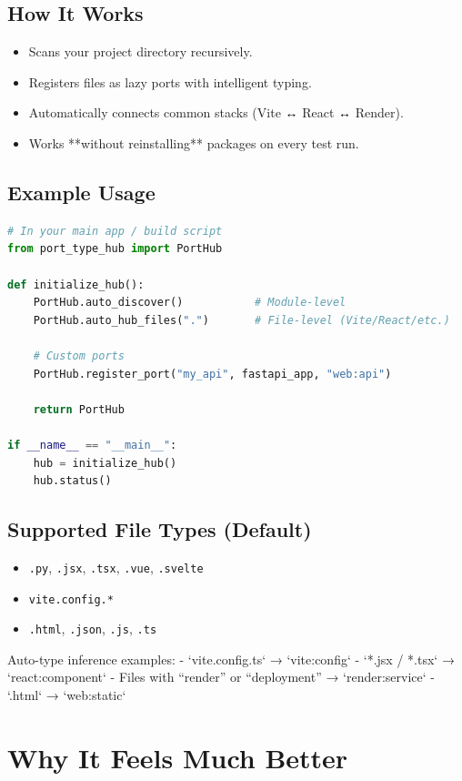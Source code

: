 \documentclass[11pt,a4paper]{article}
\begin{document}
\subsection{How It Works}
\begin{itemize}
    \item Scans your project directory recursively.
    \item Registers files as lazy ports with intelligent typing.
    \item Automatically connects common stacks (Vite ↔ React ↔ Render).
    \item Works **without reinstalling** packages on every test run.
\end{itemize}

\subsection{Example Usage}

\begin{lstlisting}[language=Python]
# In your main app / build script
from port_type_hub import PortHub

def initialize_hub():
    PortHub.auto_discover()           # Module-level
    PortHub.auto_hub_files(".")       # File-level (Vite/React/etc.)

    # Custom ports
    PortHub.register_port("my_api", fastapi_app, "web:api")
    
    return PortHub

if __name__ == "__main__":
    hub = initialize_hub()
    hub.status()
\end{lstlisting}

\subsection{Supported File Types (Default)}
\begin{itemize}
    \item \texttt{.py}, \texttt{.jsx}, \texttt{.tsx}, \texttt{.vue}, \texttt{.svelte}
    \item \texttt{vite.config.*}
    \item \texttt{.html}, \texttt{.json}, \texttt{.js}, \texttt{.ts}
\end{itemize}

Auto-type inference examples:
- `vite.config.ts` → `vite:config`
- `*.jsx / *.tsx` → `react:component`
- Files with “render” or “deployment” → `render:service`
- `.html` → `web:static`

\section{Why It Feels Much Better}
\end{document}
